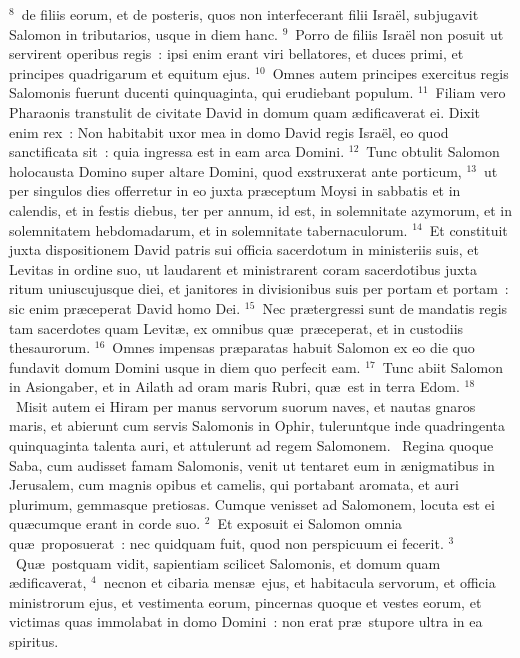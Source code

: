 ${}^{8}$~de filiis eorum, et de posteris, quos non interfecerant filii Isra\"el, subjugavit Salomon in tributarios, usque in diem hanc.
${}^{9}$~Porro de filiis Isra\"el non posuit ut servirent operibus regis~: ipsi enim erant viri bellatores, et duces primi, et principes quadrigarum et equitum ejus.
${}^{10}$~Omnes autem principes exercitus regis Salomonis fuerunt ducenti quinquaginta, qui erudiebant populum.
${}^{11}$~Filiam vero Pharaonis transtulit de civitate David in domum quam \ae dificaverat ei. Dixit enim rex~: Non habitabit uxor mea in domo David regis Isra\"el, eo quod sanctificata sit~: quia ingressa est in eam arca Domini.
${}^{12}$~Tunc obtulit Salomon holocausta Domino super altare Domini, quod exstruxerat ante porticum,
${}^{13}$~ut per singulos dies offerretur in eo juxta pr\ae ceptum Moysi in sabbatis et in calendis, et in festis diebus, ter per annum, id est, in solemnitate azymorum, et in solemnitatem hebdomadarum, et in solemnitate tabernaculorum.
${}^{14}$~Et constituit juxta dispositionem David patris sui officia sacerdotum in ministeriis suis, et Levitas in ordine suo, ut laudarent et ministrarent coram sacerdotibus juxta ritum uniuscujusque diei, et janitores in divisionibus suis per portam et portam~: sic enim pr\ae ceperat David homo Dei.
${}^{15}$~Nec pr\ae tergressi sunt de mandatis regis tam sacerdotes quam Levit\ae , ex omnibus qu\ae\ pr\ae ceperat, et in custodiis thesaurorum.
${}^{16}$~Omnes impensas pr\ae paratas habuit Salomon ex eo die quo fundavit domum Domini usque in diem quo perfecit eam.
${}^{17}$~Tunc abiit Salomon in Asiongaber, et in Ailath ad oram maris Rubri, qu\ae\ est in terra Edom.
${}^{18}$~Misit autem ei Hiram per manus servorum suorum naves, et nautas gnaros maris, et abierunt cum servis Salomonis in Ophir, tuleruntque inde quadringenta quinquaginta talenta auri, et attulerunt ad regem Salomonem.
~Regina quoque Saba, cum audisset famam Salomonis, venit ut tentaret eum in \ae nigmatibus in Jerusalem, cum magnis opibus et camelis, qui portabant aromata, et auri plurimum, gemmasque pretiosas. Cumque venisset ad Salomonem, locuta est ei qu\ae cumque erant in corde suo.
${}^{2}$~Et exposuit ei Salomon omnia qu\ae\ proposuerat~: nec quidquam fuit, quod non perspicuum ei fecerit.
${}^{3}$~Qu\ae\ postquam vidit, sapientiam scilicet Salomonis, et domum quam \ae dificaverat,
${}^{4}$~necnon et cibaria mens\ae\ ejus, et habitacula servorum, et officia ministrorum ejus, et vestimenta eorum, pincernas quoque et vestes eorum, et victimas quas immolabat in domo Domini~: non erat pr\ae\ stupore ultra in ea spiritus.

